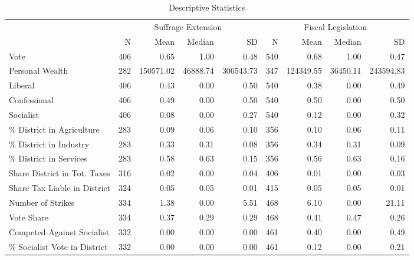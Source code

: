 \begin{table}

\caption{\label{tab:descriptives_all}Descriptive Statistics}
\centering
\begin{tabular}[t]{lrrrrrrrr}
\toprule
\multicolumn{1}{c}{ } & \multicolumn{4}{c}{Suffrage Extension} & \multicolumn{4}{c}{Fiscal Legislation} \\
\cmidrule(l{3pt}r{3pt}){2-5} \cmidrule(l{3pt}r{3pt}){6-9}
  & N & Mean & Median & SD & N  & Mean  & Median  & SD \\
\midrule
Vote & 406 & \num{0.65} & \num{1.00} & \num{0.48} & 540 & \num{0.68} & \num{1.00} & \num{0.47}\\
Personal Wealth & 282 & \num{150571.02} & \num{46888.74} & \num{306543.73} & 347 & \num{124349.55} & \num{36450.11} & \num{243594.83}\\
Liberal & 406 & \num{0.43} & \num{0.00} & \num{0.50} & 540 & \num{0.38} & \num{0.00} & \num{0.49}\\
Confessional & 406 & \num{0.49} & \num{0.00} & \num{0.50} & 540 & \num{0.50} & \num{0.00} & \num{0.50}\\
Socialist & 406 & \num{0.08} & \num{0.00} & \num{0.27} & 540 & \num{0.12} & \num{0.00} & \num{0.32}\\
\% District in Agriculture & 283 & \num{0.09} & \num{0.06} & \num{0.10} & 356 & \num{0.10} & \num{0.06} & \num{0.11}\\
\% District in Industry & 283 & \num{0.33} & \num{0.31} & \num{0.08} & 356 & \num{0.34} & \num{0.31} & \num{0.09}\\
\% District in Services & 283 & \num{0.58} & \num{0.63} & \num{0.15} & 356 & \num{0.56} & \num{0.63} & \num{0.16}\\
Share District in Tot. Taxes & 316 & \num{0.02} & \num{0.00} & \num{0.04} & 406 & \num{0.01} & \num{0.00} & \num{0.03}\\
Share Tax Liable in District & 324 & \num{0.05} & \num{0.05} & \num{0.01} & 415 & \num{0.05} & \num{0.05} & \num{0.01}\\
Number of Strikes & 334 & \num{1.38} & \num{0.00} & \num{5.51} & 468 & \num{6.10} & \num{0.00} & \num{21.11}\\
Vote Share & 334 & \num{0.37} & \num{0.29} & \num{0.29} & 468 & \num{0.41} & \num{0.47} & \num{0.26}\\
Competed Against Socialist & 332 & \num{0.00} & \num{0.00} & \num{0.00} & 461 & \num{0.40} & \num{0.00} & \num{0.49}\\
\% Socialist Vote in District & 332 & \num{0.00} & \num{0.00} & \num{0.00} & 461 & \num{0.12} & \num{0.00} & \num{0.21}\\

\end{tabular}
\end{table}

